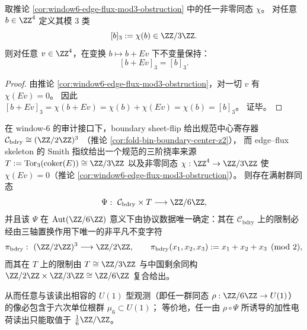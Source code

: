 \begin{corollary}[由三阶挠率诱导的同余类不变量]\label{cor:window6-edge-flux-mod3-invariant}
取推论 \ref{cor:window6-edge-flux-mod3-obstruction} 中的任一非零同态 \(\chi\)。
对任意 \(b\in\ZZ^4\) 定义其模 \(3\) 类
\[
[b]_3:=\chi(b)\in \ZZ/3\ZZ.
\]
则对任意 \(v\in\ZZ^4\)，在变换 \(b\mapsto b+Ev\) 下不变量保持：
\[
[b+Ev]_3=[b]_3.
\]
\end{corollary}
\begin{proof}
由推论 \ref{cor:window6-edge-flux-mod3-obstruction}，对一切 \(v\) 有 \(\chi(Ev)=0\)。
因此 \([b+Ev]_3=\chi(b+Ev)=\chi(b)+\chi(Ev)=\chi(b)=[b]_3\)。
证毕。
\end{proof}

\begin{theorem}\label{thm:window6-z2z3-to-z6-readout}
在 window-\(6\) 的审计接口下，boundary sheet-flip 给出规范中心寄存器
\(
\mathcal C_{\mathrm{bdry}}\cong (\ZZ/2\ZZ)^3
\)
（推论 \ref{cor:fold-bin-boundary-center-z2}），
而 edge--flux skeleton 的 Smith 指纹给出一个规范的三阶挠率来源
\(
T:=\mathrm{Tor}_3(\mathrm{coker}(E))\cong \ZZ/3\ZZ
\)
以及非零同态 \(\chi:\ZZ^4\to \ZZ/3\ZZ\) 使 \(\chi(Ev)=0\)（推论 \ref{cor:window6-edge-flux-mod3-obstruction}）。
则存在满射群同态
\[
\Psi:\ \mathcal C_{\mathrm{bdry}}\times T\longrightarrow \ZZ/6\ZZ,
\]
并且该 \(\Psi\) 在 \(\mathrm{Aut}(\ZZ/6\ZZ)\) 意义下由协议数据唯一确定：其在 \(\mathcal C_{\mathrm{bdry}}\) 上的限制必经由三轴置换作用下唯一的非平凡不变字符
\[
\pi_{\mathrm{bdry}}:\ (\ZZ/2\ZZ)^3\longrightarrow \ZZ/2\ZZ,
\qquad
\pi_{\mathrm{bdry}}(x_1,x_2,x_3):=x_1+x_2+x_3\pmod 2,
\]
而其在 \(T\) 上的限制由 \(T\cong\ZZ/3\ZZ\) 与中国剩余同构 \(\ZZ/2\ZZ\times\ZZ/3\ZZ\cong\ZZ/6\ZZ\) 复合给出。
\par
从而任意与该读出相容的 \(U(1)\) 型观测（即任一群同态 \(\rho:\ZZ/6\ZZ\to U(1)\)）的像必包含于六次单位根群 \(\mu_6\subset U(1)\)；
等价地，任一由 \(\rho\circ\Psi\) 所诱导的加性电荷读出只能取值于 \(\frac{1}{6}\ZZ/\ZZ\)。
\end{theorem}

